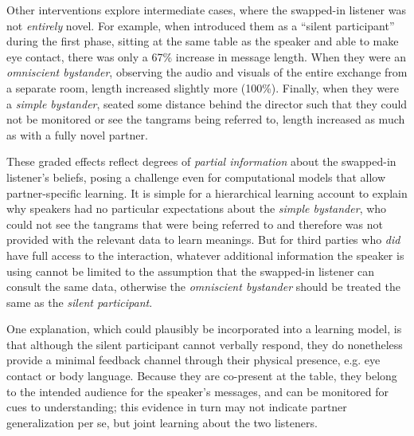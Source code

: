 Other interventions explore intermediate cases, where the swapped-in listener was not \emph{entirely} novel. For example, when  introduced them as a ``silent participant'' during the first phase, sitting at the same table as the speaker and able to make eye contact, there was only a 67\% increase in message length. When they were an \emph{omniscient bystander}, observing the audio and visuals of the entire exchange from a separate room, length increased slightly more (100\%). Finally, when they were a \emph{simple bystander}, seated some distance behind the director such that they could not be monitored or see the tangrams being referred to, length increased as much as with a fully novel partner. 

These graded effects reflect degrees of \emph{partial information} about the swapped-in listener's beliefs, posing a challenge even for computational models that allow partner-specific learning. It is simple for a hierarchical learning account to explain why speakers had no particular expectations about the \emph{simple bystander}, who could not see the tangrams that were being referred to and therefore was not provided with the relevant data to learn meanings. But for third parties who \emph{did} have full access to the interaction, whatever additional information the speaker is using cannot be limited to the assumption that the swapped-in listener can consult the same data, otherwise the \emph{omniscient bystander} should be treated the same as the \emph{silent participant}. 

One explanation, which could plausibly be incorporated into a learning model, is that although the silent participant cannot verbally respond, they do nonetheless provide a minimal feedback channel through their physical presence, e.g. eye contact or body language. Because they are co-present at the table, they belong to the intended audience for the speaker's messages, and can be monitored for cues to understanding; this evidence in turn may not indicate partner generalization per se, but joint learning about the two listeners. 

